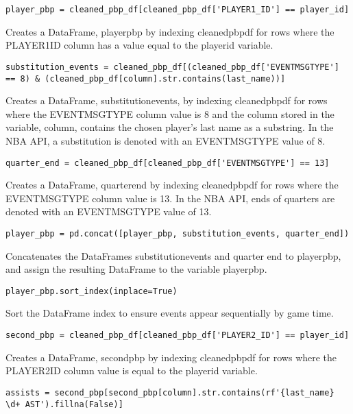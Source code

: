 \documentclass{article}
\begin{document}
\begin{lstlisting}
player_pbp = cleaned_pbp_df[cleaned_pbp_df['PLAYER1_ID'] == player_id]
\end{lstlisting}
Creates a DataFrame, player\textunderscore pbp by indexing cleaned\textunderscore pbp\textunderscore df for rows where the PLAYER1\textunderscore ID column has a value equal to the player\textunderscore id variable.
\begin{lstlisting}
substitution_events = cleaned_pbp_df[(cleaned_pbp_df['EVENTMSGTYPE'] == 8) & (cleaned_pbp_df[column].str.contains(last_name))]
\end{lstlisting}
Creates a DataFrame, substitution\textunderscore events, by indexing cleaned\textunderscore pbp\textunderscore df for rows where the EVENTMSGTYPE column value is 8 and the column stored in the variable, column, contains the chosen player's last name as a substring. In the NBA API, a substitution is denoted with an EVENTMSGTYPE value of 8.
\begin{lstlisting}
quarter_end = cleaned_pbp_df[cleaned_pbp_df['EVENTMSGTYPE'] == 13]
\end{lstlisting}
Creates a DataFrame, quarter\textunderscore end by indexing cleaned\textunderscore pbp\textunderscore df for rows where the EVENTMSGTYPE column value is 13. In the NBA API, ends of quarters are denoted with an EVENTMSGTYPE value of 13.
\begin{lstlisting}
player_pbp = pd.concat([player_pbp, substitution_events, quarter_end])
\end{lstlisting}
Concatenates the DataFrames substitution\textunderscore events and quarter \textunderscore end to player\textunderscore pbp, and assign the resulting DataFrame to the variable player\textunderscore pbp.
\begin{lstlisting}
player_pbp.sort_index(inplace=True)
\end{lstlisting}
Sort the DataFrame index to ensure events appear sequentially by game time.
\begin{lstlisting}
second_pbp = cleaned_pbp_df[cleaned_pbp_df['PLAYER2_ID'] == player_id]
\end{lstlisting}
Creates a DataFrame, second\textunderscore pbp by indexing cleaned\textunderscore pbp\textunderscore df for rows where the PLAYER2\textunderscore ID column value is equal to the player\textunderscore id variable.
\begin{lstlisting}
assists = second_pbp[second_pbp[column].str.contains(rf'{last_name} \d+ AST').fillna(False)]
\end{lstlisting}
\end{document}
